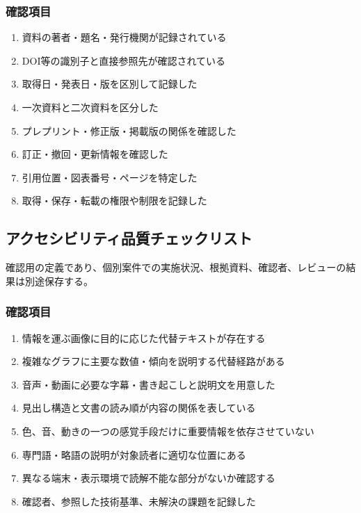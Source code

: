 \documentclass[a4paper,11pt]{article}
\begin{document}
\subsubsection*{確認項目}
\begin{enumerate}[leftmargin=2em,itemsep=0.3em]
\item 資料の著者・題名・発行機関が記録されている\par
\item DOI等の識別子と直接参照先が確認されている\par
\item 取得日・発表日・版を区別して記録した\par
\item 一次資料と二次資料を区分した\par
\item プレプリント・修正版・掲載版の関係を確認した\par
\item 訂正・撤回・更新情報を確認した\par
\item 引用位置・図表番号・ページを特定した\par
\item 取得・保存・転載の権限や制限を記録した\par
\end{enumerate}
\subsection{アクセシビリティ品質チェックリスト}
\par 確認用の定義であり、個別案件での実施状況、根拠資料、確認者、レビューの結果は別途保存する。\par\medskip
\subsubsection*{確認項目}
\begin{enumerate}[leftmargin=2em,itemsep=0.3em]
\item 情報を運ぶ画像に目的に応じた代替テキストが存在する\par
\item 複雑なグラフに主要な数値・傾向を説明する代替経路がある\par
\item 音声・動画に必要な字幕・書き起こしと説明文を用意した\par
\item 見出し構造と文書の読み順が内容の関係を表している\par
\item 色、音、動きの一つの感覚手段だけに重要情報を依存させていない\par
\item 専門語・略語の説明が対象読者に適切な位置にある\par
\item 異なる端末・表示環境で読解不能な部分がないか確認する\par
\item 確認者、参照した技術基準、未解決の課題を記録した\par
\end{enumerate}
\end{document}
